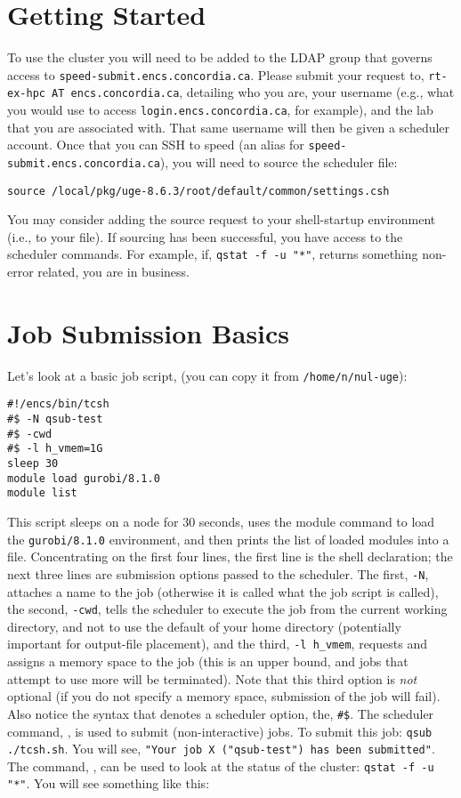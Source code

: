 \documentclass{easychair}
\begin{document}
\section{Getting Started}

To use the cluster you will need to be added to the LDAP group that governs access to \texttt{speed-submit.encs.concordia.ca}. Please submit your request to, 
\texttt{rt-ex-hpc AT encs.concordia.ca}, detailing who you are, your username (e.g., what you  would use to access \texttt{login.encs.concordia.ca}, for example), and the lab that you are  associated with. That same username will then be given a scheduler account. Once that you can SSH to speed (an alias for \texttt{speed-submit.encs.concordia.ca}), you will  
need to source the scheduler file:

\begin{verbatim}
source /local/pkg/uge-8.6.3/root/default/common/settings.csh 
\end{verbatim}

You may consider adding the source request to your shell-startup environment (i.e., to  your  file). If sourcing has been successful, you have access to the scheduler commands. For example, if, \texttt{qstat -f -u "*"}, returns something non-error related, you are  in business. 

\section{Job Submission Basics}

Let's look at a basic job script,  (you can copy it from \texttt{/home/n/nul-uge}):

\begin{verbatim}
#!/encs/bin/tcsh 
#$ -N qsub-test 
#$ -cwd 
#$ -l h_vmem=1G 
sleep 30 
module load gurobi/8.1.0 
module list 
\end{verbatim}

This script sleeps on a node for 30 seconds, uses the module command to load the \texttt{gurobi/8.1.0} environment, and then prints the list of loaded modules into a file.  Concentrating on the first four lines, the first line is the shell declaration; the next three lines are submission options passed to the scheduler. The first, \texttt{-N}, attaches a name to the job (otherwise it is called what the job script is called), the second, \texttt{-cwd}, tells  the scheduler to execute the job from the current working directory, and not to use the default of your home directory (potentially important for output-file placement), and the third, \texttt{-l h\_vmem}, requests and assigns a memory space to the job (this is an upper  bound, and jobs that attempt to use more will be terminated). Note that this third option 
is \emph{not} optional (if you do not specify a memory space, submission of the job will fail).  Also notice the syntax that denotes a scheduler option, the, \verb+#$+. 
The scheduler command, , is used to submit (non-interactive) jobs. To submit this  job: \texttt{qsub ./tcsh.sh}. You will see, \texttt{"Your job X ("qsub-test") has been submitted"}. The  command, , can be used to look at the status of the cluster: \texttt{qstat -f -u "*"}. You will  see something like this: 
\end{document}
